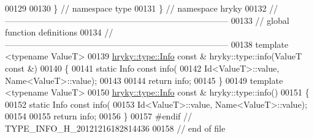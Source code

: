 \begin{DoxyCode}
00129 
00130 \} \textcolor{comment}{// namespace type}
00131 \} \textcolor{comment}{// namespace hryky}
00132 \textcolor{comment}{//
      ------------------------------------------------------------------------------}
00133 \textcolor{comment}{// global function definitions}
00134 \textcolor{comment}{//
      ------------------------------------------------------------------------------}
00138 \textcolor{comment}{}\textcolor{keyword}{template} <\textcolor{keyword}{typename} ValueT>
00139 \hyperlink{classhryky_1_1type_1_1_info}{hryky::type::Info} \textcolor{keyword}{const} & hryky::type::info(ValueT \textcolor{keyword}{const} &)
00140 \{
00141     \textcolor{keyword}{static} Info \textcolor{keyword}{const} info(
00142         Id<ValueT>::value, Name<ValueT>::value);
00143     
00144     \textcolor{keywordflow}{return} info;
00145 \}
00149 \textcolor{keyword}{template} <\textcolor{keyword}{typename} ValueT>
00150 \hyperlink{classhryky_1_1type_1_1_info}{hryky::type::Info} \textcolor{keyword}{const} & hryky::type::info()
00151 \{
00152     \textcolor{keyword}{static} Info \textcolor{keyword}{const} info(
00153         Id<ValueT>::value, Name<ValueT>::value);
00154     
00155     \textcolor{keywordflow}{return} info;
00156 \}
00157 \textcolor{preprocessor}{#endif // TYPE\_INFO\_H\_20121216182814436}
00158 \textcolor{preprocessor}{}\textcolor{comment}{// end of file}
\end{DoxyCode}
